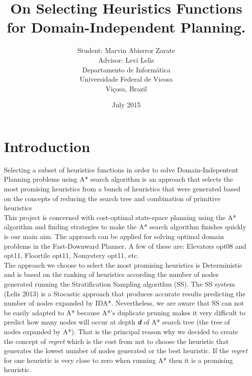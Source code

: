 \documentclass[11pt,a4paper,oneside]{report}
\begin{document}
\title{On Selecting Heuristics Functions for Domain-Independent Planning.}
\providecommand{\keywords}[1]{\textbf{keywords} #1}
\author{Student: Marvin Abisrror Zarate\\ Advisor: Levi Lelis \\
Departamento de Informática \\Universidade Federal de Vicosa \\Viçosa, Brazil}

\date{\color{black}July 2015}
\maketitle

\section{Introduction}
\label{sec:1}
Selecting a subset of heuristics functions in order to solve Domain-Indepentent Planning problems using A* search algorithm is an approach that selects the most promising heuristics from a bunch of heuristics that were generated based on the concepts of reducing the search tree and combination of primitive heuristics \citep{BarleySantiagoOver}
\\
This project is concerned with cost-optimal state-space planning using the A* algorithm and finding strategies to make the A* search algorithm finishes quickly is our main aim. The approach can be applied for solving optimal domain problems in the Fast-Downward Planner. A few of these are: Elevators opt08 and opt11, Floortile opt11, Nomystery opt11, etc.
\\
The approach we choose to select the most promising heuristics is Deterministic and is based on the ranking of heuristics according the number of nodes generated running the Stratification Sampling algorithm (SS). The SS system (Lelis  2013) is a Stocastic approach that produces accurate results predicting the number of nodes expanded by IDA*. Nevertheless, we are aware that SS can not be easily adapted to A* because A*'s duplicate pruning makes it very difficult to predict how many nodes will occur at depth \textit{\textbf{d}} of A* search tree (the tree of nodes expanded by A*). That is the principal reason why we decided to create the concept of \textit{regret} which is the cost from not to choose the heuristic that generates the lowest number of nodes generated or the best heuristic. If the \textit{regret} for one heuristic is very close to zero when running A* then it is a promising heuristic.
\end{document}

